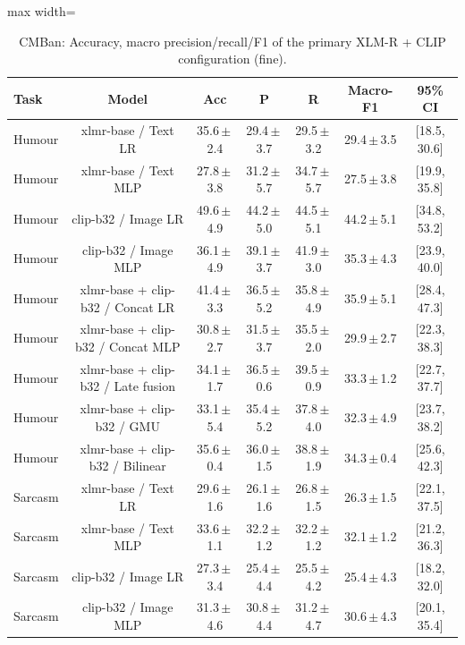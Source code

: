 \begin{table}[t]
\centering
\small
\caption{CMBan: Accuracy, macro precision/recall/F1 of the primary XLM-R + CLIP configuration (fine).}
\label{tab:primary_fine_cmban}
\begin{adjustbox}{max width=\textwidth}
\begin{tabular}{lcccccc}
\toprule
Task & Model & Acc & P & R & Macro-F1 & 95\% CI \\
\midrule
Humour & xlmr-base / Text LR & 35.6\,$\pm$\,2.4 & 29.4\,$\pm$\,3.7 & 29.5\,$\pm$\,3.2 & 29.4\,$\pm$\,3.5 & [18.5, 30.6] \\
Humour & xlmr-base / Text MLP & 27.8\,$\pm$\,3.8 & 31.2\,$\pm$\,5.7 & 34.7\,$\pm$\,5.7 & 27.5\,$\pm$\,3.8 & [19.9, 35.8] \\
Humour & clip-b32 / Image LR & 49.6\,$\pm$\,4.9 & 44.2\,$\pm$\,5.0 & 44.5\,$\pm$\,5.1 & 44.2\,$\pm$\,5.1 & [34.8, 53.2] \\
Humour & clip-b32 / Image MLP & 36.1\,$\pm$\,4.9 & 39.1\,$\pm$\,3.7 & 41.9\,$\pm$\,3.0 & 35.3\,$\pm$\,4.3 & [23.9, 40.0] \\
Humour & xlmr-base + clip-b32 / Concat LR & 41.4\,$\pm$\,3.3 & 36.5\,$\pm$\,5.2 & 35.8\,$\pm$\,4.9 & 35.9\,$\pm$\,5.1 & [28.4, 47.3] \\
Humour & xlmr-base + clip-b32 / Concat MLP & 30.8\,$\pm$\,2.7 & 31.5\,$\pm$\,3.7 & 35.5\,$\pm$\,2.0 & 29.9\,$\pm$\,2.7 & [22.3, 38.3] \\
Humour & xlmr-base + clip-b32 / Late fusion & 34.1\,$\pm$\,1.7 & 36.5\,$\pm$\,0.6 & 39.5\,$\pm$\,0.9 & 33.3\,$\pm$\,1.2 & [22.7, 37.7] \\
Humour & xlmr-base + clip-b32 / GMU & 33.1\,$\pm$\,5.4 & 35.4\,$\pm$\,5.2 & 37.8\,$\pm$\,4.0 & 32.3\,$\pm$\,4.9 & [23.7, 38.2] \\
Humour & xlmr-base + clip-b32 / Bilinear & 35.6\,$\pm$\,0.4 & 36.0\,$\pm$\,1.5 & 38.8\,$\pm$\,1.9 & 34.3\,$\pm$\,0.4 & [25.6, 42.3] \\
Sarcasm & xlmr-base / Text LR & 29.6\,$\pm$\,1.6 & 26.1\,$\pm$\,1.6 & 26.8\,$\pm$\,1.5 & 26.3\,$\pm$\,1.5 & [22.1, 37.5] \\
Sarcasm & xlmr-base / Text MLP & 33.6\,$\pm$\,1.1 & 32.2\,$\pm$\,1.2 & 32.2\,$\pm$\,1.2 & 32.1\,$\pm$\,1.2 & [21.2, 36.3] \\
Sarcasm & clip-b32 / Image LR & 27.3\,$\pm$\,3.4 & 25.4\,$\pm$\,4.4 & 25.5\,$\pm$\,4.2 & 25.4\,$\pm$\,4.3 & [18.2, 32.0] \\
Sarcasm & clip-b32 / Image MLP & 31.3\,$\pm$\,4.6 & 30.8\,$\pm$\,4.4 & 31.2\,$\pm$\,4.7 & 30.6\,$\pm$\,4.3 & [20.1, 35.4] \\

\end{tabular}
\end{adjustbox}
\end{table}
